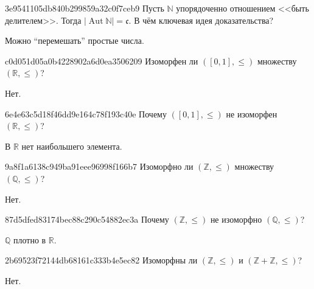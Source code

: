\begin{note}{3e9541105db840b299859a32c0f7ceb9}
    Пусть \({ \mathbb N }\) упорядоченно отношением <<быть делителем>>.
    Тогда \({ \left\lvert \operatorname{Aut} \mathbb N \right\rvert = \mathfrak{c} }\).
    В чём ключевая идея доказательства?

    \begin{cloze}{1}
        Можно ``перемешать'' простые числа.
    \end{cloze}
\end{note}

\begin{note}{c0d051d05a0b4228902a6d0ea3506209}
    Изоморфен ли \({ ([0, 1], \leqslant) }\) множеству \({ (\mathbb R, \leqslant) }\)?

    \begin{cloze}{1}
        Нет.
    \end{cloze}
\end{note}

\begin{note}{6e4e63c5d18f46dd9e164c78f193c40e}
    Почему \({ ([0, 1], \leqslant) }\) не изоморфен \({ (\mathbb R, \leqslant) }\)?

    \begin{cloze}{1}
        В \({ \mathbb R }\) нет наибольшего элемента.
    \end{cloze}
\end{note}

\begin{note}{9a8f1a6138c949ba91eee96998f166b7}
    Изоморфно ли \({ (\mathbb Z, \leqslant) }\) множеству \({ (\mathbb Q, \leqslant) }\)?

    \begin{cloze}{1}
        Нет.
    \end{cloze}
\end{note}

\begin{note}{87d5dfed83174bec88c290c54882ec3a}
    Почему \({ (\mathbb Z, \leqslant) }\) не изоморфно \({ (\mathbb Q, \leqslant) }\)?

    \begin{cloze}{1}
        \({ \mathbb Q }\) плотно в \({ \mathbb R }\).
    \end{cloze}
\end{note}

\begin{note}{2b69523f72144db68161c333b4e5ec82}
    Изоморфны ли \({ (\mathbb Z, \leqslant) }\) и \({ (\mathbb Z + \mathbb Z, \leqslant) }\)?

    \begin{cloze}{1}
        Нет.
    \end{cloze}
\end{note}

